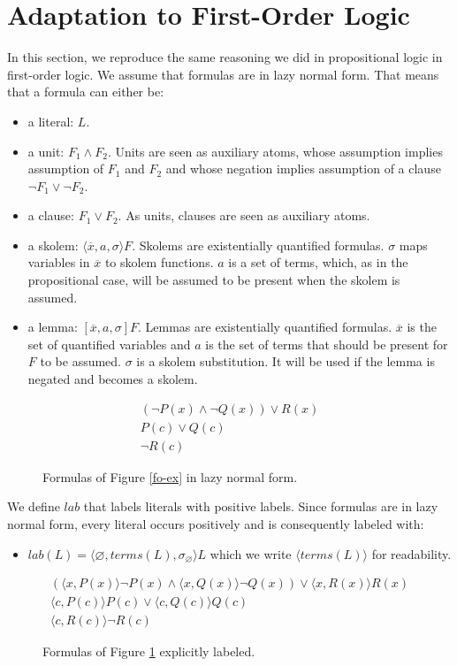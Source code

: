\documentclass[a4paper,11pt]{article}
\newcommand{\terms}{\mathit{terms}}
\newcommand{\T}{\mathit{lab}}
\begin{document}
\section{Adaptation to First-Order Logic}
In this section, we reproduce the same reasoning we did in propositional logic in first-order logic.
We assume that formulas are in lazy normal form. That means that a formula can either be:
\begin{itemize}
 \item a literal: $L$.
 \item a unit: $F_1\wedge F_2$. Units are seen as auxiliary atoms, whose assumption implies
assumption of $F_1$ and $F_2$ and whose negation implies assumption of a clause $\neg F_1\vee \neg F_2$.
 \item a clause: $F_1\vee F_2$. As units, clauses are seen as auxiliary atoms.
 \item a skolem: $\langle\overline x,a,\sigma\rangle F$. Skolems are existentially quantified formulas.
$\sigma$ maps variables in $\overline x$ to skolem functions. $a$ is a set of terms, which, as in the 
propositional case, will be assumed to be present when the skolem is assumed.
 \item a lemma: $[\overline x,a,\sigma]F$. Lemmas are existentially quantified formulas. $\overline x$
is the set of quantified variables and $a$ is the set of terms that should be present for $F$ to be
assumed. $\sigma$ is a skolem substitution. It will be used if the lemma is negated and becomes a skolem.
\end{itemize}
\begin{figure}
 \begin{eqnarray*}
 [x,P(x),x\mapsto b](\neg P(x)\wedge\neg Q(x))\vee R(x)\\
 P(c)\vee Q(c)\\
 \neg R(c)
\end{eqnarray*}
\caption{\label{fo-exn}Formulas of Figure \ref{fo-ex} in lazy normal form.}
\end{figure}
We define $\T$ that labels literals with positive labels. Since formulas are in lazy
normal form, every literal occurs positively and is consequently labeled with:
\begin{itemize}
 \item $\T(L)=\langle\varnothing,\terms(L),\sigma_\varnothing\rangle L$ which we write
$\langle\terms(L)\rangle$ for readability.
\end{itemize}
\begin{figure}
 \begin{eqnarray*}
 [x,P(x),x\mapsto b](\langle x,P(x)\rangle\neg P(x)\wedge
\langle x,Q(x)\rangle\neg Q(x))\vee
\langle x,R(x)\rangle R(x)\\
 \langle c,P(c)\rangle P(c)\vee
\langle c,Q(c)\rangle Q(c)\\
 \langle c,R(c)\rangle\neg R(c)
\end{eqnarray*}
\caption{\label{fol-ex}Formulas of Figure \ref{fo-exn} explicitly labeled.}
\end{figure}
\end{document}
